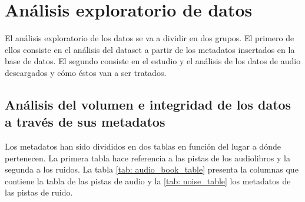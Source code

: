 \chapter{Análisis exploratorio de datos}\label{ch: eda}
El análisis exploratorio de los datos se va a dividir en dos grupos. El primero de ellos consiste en el análisis del dataset a partir de los metadatos insertados en la base de datos. El segundo consiste en el estudio y el análisis de los datos de audio descargados y cómo éstos van a ser tratados.

\section{Análisis del volumen e integridad de los datos a través de sus metadatos}
Los metadatos han sido divididos en dos tablas en función del lugar a dónde pertenecen. La primera tabla hace referencia a las pistas de los audiolibros y la segunda a los ruidos. La tabla \ref{tab: audio_book_table} presenta la columnas que contiene la tabla de las pistas de audio y la \ref{tab: noise_table} los metadatos de las pistas de ruido.

